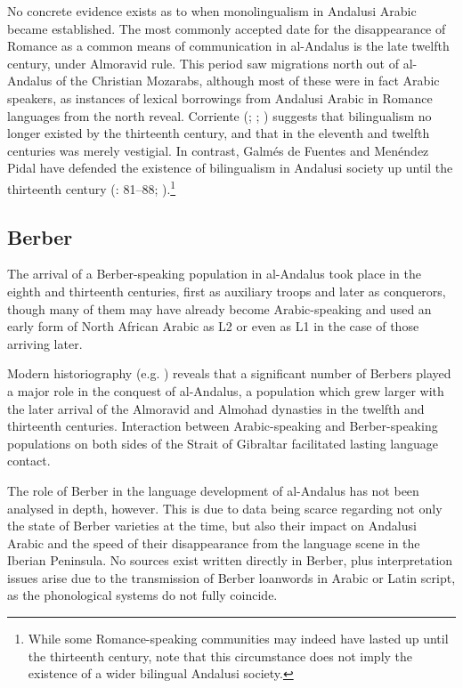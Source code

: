 \documentclass[output=paper,modfonts,nonflat]{langsci/langscibook}
\begin{document}
No concrete evidence exists as to when monolingualism in Andalusi Arabic became established. The most commonly accepted date for the disappearance of Romance as a common means of communication in al-Andalus is the late twelfth century, under Almoravid rule. This period saw migrations north out of al-Andalus of the Christian Mozarabs, although most of these were in fact Arabic speakers, as instances of lexical borrowings from Andalusi Arabic in Romance languages from the north reveal. Corriente (\citeyear{Corriente1997dictionary}; \citeyear[443]{Corriente1992book}; \citeyear{Corriente2005}) suggests that bilingualism no longer existed by the thirteenth century, and that in the eleventh and twelfth centuries was merely vestigial. In contrast, Galmés de Fuentes and Menéndez Pidal have defended the existence of bilingualism in Andalusi society up until the thirteenth century (\citealt{GalmésdeFuentes1994}: 81–88; \citealt{MenéndezPidalGalmésdeFuentes2001}).\footnote{While some Romance-speaking communities may indeed have lasted up until the thirteenth century, note that this circumstance does not imply the existence of a wider bilingual Andalusi society.} 

\subsection{Berber}

The arrival of a Berber-speaking population in al-Andalus took place in the eighth and thirteenth centuries, first as auxiliary troops and later as conquerors, though many of them may have already become Arabic-speaking and used an early form of North African Arabic as L2 or even as L1 in the case of those arriving later. 

Modern historiography (e.g. \citealt{ManzanoMoreno1990,Guichard1995,Chalmeta2003}) reveals that a significant number of Berbers played a major role in the conquest of al-Andalus, a population which grew larger with the later arrival of the Almoravid and Almohad dynasties in the twelfth and thirteenth centuries. Interaction between Arabic-speaking and Berber-speaking populations on both sides of the Strait of Gibraltar facilitated lasting language contact. 

The role of Berber in the language development of al-Andalus has not been analysed in depth, however. This is due to data being scarce regarding not only the state of Berber varieties at the time, but also their impact on Andalusi Arabic and the speed of their disappearance from the language scene in the Iberian Peninsula. No sources exist written directly in Berber, plus interpretation issues arise due to the transmission of Berber loanwords in Arabic or Latin script, as the phonological systems do not fully coincide.  
\end{document}
